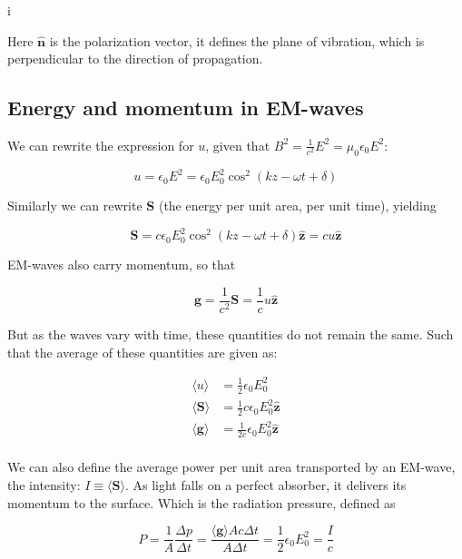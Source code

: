 i\documentclass[a4paper]{article}
\begin{document}
Here $\hat{\bm{n}}$ is the polarization vector, it defines the plane of vibration, which is perpendicular to the direction of propagation.

\subsection{Energy and momentum in EM-waves}

We can rewrite the expression for $u$, given that $B^2=\frac{1}{c^2}E^2=\mu_0\epsilon_0E^2$:

\begin{equation*}
    u=\epsilon_0E^2=\epsilon_0E_0^2\cos^2(kz-\omega t+\delta)
\end{equation*}

Similarly we can rewrite $\bm{S}$ (the energy per unit area, per unit time), yielding

\begin{equation*}
    \bm{S}=c\epsilon_0E_0^2\cos^2(kz-\omega t+\delta)\hat{\bm{z}}=cu\hat{\bm{z}}
\end{equation*}

EM-waves also carry momentum, so that

\begin{equation*}
    \bm{g}=\frac{1}{c^2}\bm{S}=\frac{1}{c}u\hat{\bm{z}}
\end{equation*}

But as the waves vary with time, these quantities do not remain the same. Such that the average of these quantities are given as:

\begin{align*}
    \langle u\rangle &= \frac{1}{2}\epsilon_0E_0^2\\[1em]
    \langle \bm{S}\rangle &= \frac{1}{2}c\epsilon_0E_0^2\hat{\bm{z}}\\[1em]
    \langle \bm{g}\rangle &= \frac{1}{2c}\epsilon_0E_0^2\hat{\bm{z}}\\
\end{align*}

We can also define the average power per unit area transported by an EM-wave, the intensity: $I\equiv\langle\bm{S}\rangle$. As light falls on a perfect absorber, it delivers its momentum to the surface. Which is the radiation pressure, defined as

\begin{equation*}
    P=\frac{1}{A}\frac{\Delta p}{\Delta t}=\frac{\langle\bm{g}\rangle Ac\Delta t}{A\Delta t}=\frac{1}{2}\epsilon_0E_0^2=\frac{I}{c}
\end{equation*}
\end{document}
